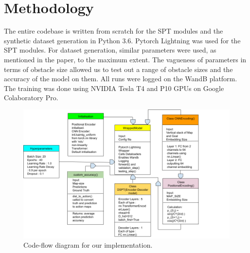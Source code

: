 \section{Methodology}
The entire codebase is written from scratch for the SPT modules and the synthetic dataset generation in Python 3.6. Pytorch Lightning was used for the SPT modules. For dataset generation, similar parameters were used, as mentioned in the paper, to the maximum extent. The vagueness of parameters in terms of obstacle size allowed us to test out a range of obstacle sizes and the accuracy of the model on them. All runs were logged on the WandB platform. The training was done using NVIDIA Tesla T4 and P10 GPUs on Google Colaboratory Pro.
\begin{figure}
\begin {center}
\includegraphics[width=1.15\textwidth]{../openreview/images/DSPT-MLRC.png}
\caption{Code-flow diagram for our implementation.}
\label{fig:ecg}
\end {center}
\end{figure}
